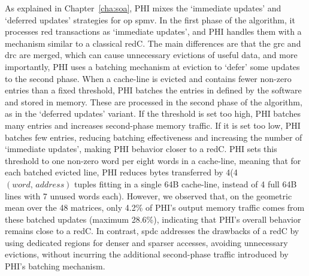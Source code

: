 As explained in Chapter~\ref{cha:soa}, PHI mixes the `immediate updates' and `deferred updates' strategies for \acrshort{op} \acrshort{spmv}.
In the first phase of the algorithm, it processes \acrshort{red} transactions as `immediate updates', and PHI handles them with a mechanism similar to a classical \gls{redC}.
The main differences are that the \acrshort{grc} and \acrshort{drc} are merged, which can cause unnecessary \glspl{eviction} of useful data, and more importantly, PHI uses a batching mechanism at \gls{eviction} to `defer' some updates to the second phase.
When a cache-line is evicted and contains fewer non-zero entries than a fixed threshold, PHI batches the entries in  defined by the software and stored in memory.
These  are processed in the second phase of the algorithm, as in the `deferred updates' variant.
If the threshold is set too high, PHI batches many entries and increases second-phase memory traffic.
If it is set too low, PHI batches few entries, reducing batching effectiveness and increasing the number of `immediate updates', making PHI behavior closer to a \gls{redC}.
PHI sets this threshold to one non-zero word per eight words in a cache-line, meaning that for each batched evicted line, PHI reduces bytes transferred by 4\tms (4 $(word, \, address)$ tuples fitting in a single 64B cache-line, instead of 4 full 64B lines with 7 unused words each).
However, we observed that, on the geometric mean over the 48 matrices, only 4.2\% of PHI's output memory traffic comes from these batched updates (maximum 28.6\%), indicating that PHI's overall behavior remains close to a \gls{redC}.
In contrast, \acrlong{spdc} addresses the drawbacks of a \gls{redC} by using dedicated regions for denser and sparser accesses, avoiding unnecessary \glspl{eviction}, without incurring the additional second-phase traffic introduced by PHI's batching mechanism.

